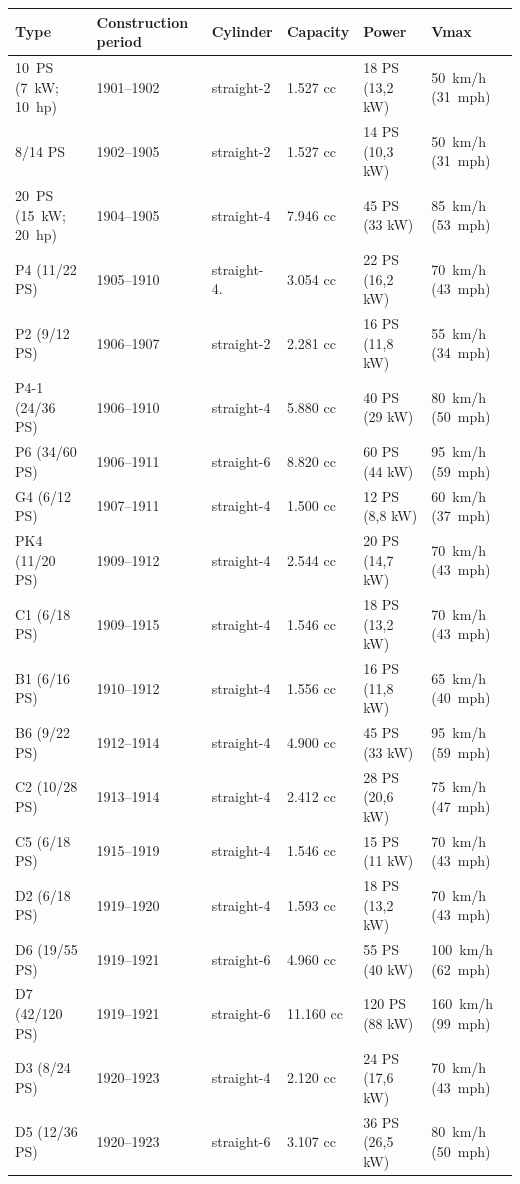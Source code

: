 \documentclass{article}
\begin{document}
\begin{tabular}{llllll}
\toprule
Type & Construction period & Cylinder & Capacity & Power & Vmax \\
\midrule
10 PS (7 kW; 10 hp) & 1901–1902 & straight-2 & 1.527 cc & 18 PS (13,2 kW) & 50 km/h (31 mph) \\
8/14 PS & 1902–1905 & straight-2 & 1.527 cc & 14 PS (10,3 kW) & 50 km/h (31 mph) \\
20 PS (15 kW; 20 hp) & 1904–1905 & straight-4 & 7.946 cc & 45 PS (33 kW) & 85 km/h (53 mph) \\
P4 (11/22 PS) & 1905–1910 & straight-4. & 3.054 cc & 22 PS (16,2 kW) & 70 km/h (43 mph) \\
P2 (9/12 PS) & 1906–1907 & straight-2 & 2.281 cc & 16 PS (11,8 kW) & 55 km/h (34 mph) \\
P4-1 (24/36 PS) & 1906–1910 & straight-4 & 5.880 cc & 40 PS (29 kW) & 80 km/h (50 mph) \\
P6 (34/60 PS) & 1906–1911 & straight-6 & 8.820 cc & 60 PS (44 kW) & 95 km/h (59 mph) \\
G4 (6/12 PS) & 1907–1911 & straight-4 & 1.500 cc & 12 PS (8,8 kW) & 60 km/h (37 mph) \\
PK4 (11/20 PS) & 1909–1912 & straight-4 & 2.544 cc & 20 PS (14,7 kW) & 70 km/h (43 mph) \\
C1 (6/18 PS) & 1909–1915 & straight-4 & 1.546 cc & 18 PS (13,2 kW) & 70 km/h (43 mph) \\
B1 (6/16 PS) & 1910–1912 & straight-4 & 1.556 cc & 16 PS (11,8 kW) & 65 km/h (40 mph) \\
B6 (9/22 PS) & 1912–1914 & straight-4 & 4.900 cc & 45 PS (33 kW) & 95 km/h (59 mph) \\
C2 (10/28 PS) & 1913–1914 & straight-4 & 2.412 cc & 28 PS (20,6 kW) & 75 km/h (47 mph) \\
C5 (6/18 PS) & 1915–1919 & straight-4 & 1.546 cc & 15 PS (11 kW) & 70 km/h (43 mph) \\
D2 (6/18 PS) & 1919–1920 & straight-4 & 1.593 cc & 18 PS (13,2 kW) & 70 km/h (43 mph) \\
D6 (19/55 PS) & 1919–1921 & straight-6 & 4.960 cc & 55 PS (40 kW) & 100 km/h (62 mph) \\
D7 (42/120 PS) & 1919–1921 & straight-6 & 11.160 cc & 120 PS (88 kW) & 160 km/h (99 mph) \\
D3 (8/24 PS) & 1920–1923 & straight-4 & 2.120 cc & 24 PS (17,6 kW) & 70 km/h (43 mph) \\
D5 (12/36 PS) & 1920–1923 & straight-6 & 3.107 cc & 36 PS (26,5 kW) & 80 km/h (50 mph) \\

\end{tabular}
\end{document}
